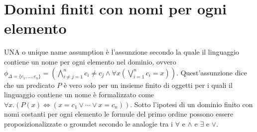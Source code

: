 \section{Domini finiti con nomi per ogni elemento}
UNA o unique name assumption \`e l'assunzione secondo la quale il linguaggio contiene un nome per ogni elemento nel dominio, ovvero $\phi_{\Delta=\{c_1, \dots, c_n\}}=(\bigwedge\limits_{i\neq j=1}^n
c_i\neq c_j\land\forall x(\bigvee\limits_{i=1}^nc_i=x))$. Quest'assunzione dice che un predicato $P$ \`e vero solo per un insieme finito di oggetti per i quali il linguaggio contiene un nome \`e formalizzato
come $\forall x.(P(x)\Leftrightarrow(x=c_1\lor\cdots\lor x=c_n))$.  Sotto l'ipotesi di un dominio finito con nomi costanti per ogni elemento le formule del primo ordine possono essere proposizionalizzate o 
groundet secondo le analogie tra i $\forall$ e $\land$ e $\exists$ e $\lor$. 